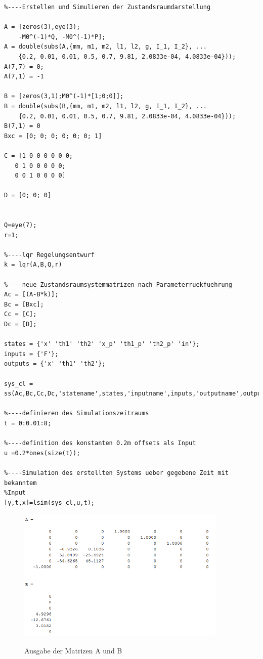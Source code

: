 \documentclass[a4paper, 10pt]{report}
\begin{document}
\begin{lstlisting}
%----Erstellen und Simulieren der Zustandsraumdarstellung

A = [zeros(3),eye(3);
    -M0^(-1)*Q, -M0^(-1)*P];
A = double(subs(A,{mm, m1, m2, l1, l2, g, I_1, I_2}, ...
    {0.2, 0.01, 0.01, 0.5, 0.7, 9.81, 2.0833e-04, 4.0833e-04}));
A(7,7) = 0;
A(7,1) = -1

B = [zeros(3,1);M0^(-1)*[1;0;0]];
B = double(subs(B,{mm, m1, m2, l1, l2, g, I_1, I_2}, ...
    {0.2, 0.01, 0.01, 0.5, 0.7, 9.81, 2.0833e-04, 4.0833e-04}));
B(7,1) = 0
Bxc = [0; 0; 0; 0; 0; 0; 1]

C = [1 0 0 0 0 0 0;
   0 1 0 0 0 0 0;
   0 0 1 0 0 0 0]

D = [0; 0; 0]


Q=eye(7);
r=1;

%----lqr Regelungsentwurf
k = lqr(A,B,Q,r)

%----neue Zustandsraumsystemmatrizen nach Parameterruekfuehrung
Ac = [(A-B*k)];
Bc = [Bxc];
Cc = [C];
Dc = [D];

states = {'x' 'th1' 'th2' 'x_p' 'th1_p' 'th2_p' 'in'};
inputs = {'F'};
outputs = {'x' 'th1' 'th2'};

sys_cl = ss(Ac,Bc,Cc,Dc,'statename',states,'inputname',inputs,'outputname',outputs);

%----definieren des Simulationszeitraums
t = 0:0.01:8;

%----definition des konstanten 0.2m offsets als Input
u =0.2*ones(size(t));

%----Simulation des erstellten Systems ueber gegebene Zeit mit bekanntem
%Input
[y,t,x]=lsim(sys_cl,u,t);
\end{lstlisting}
\begin{figure}[h]
\centering  %
{\includegraphics[width=10cm]{MatrixAB}}
\caption{Ausgabe der Matrizen A und B}
\end{figure}
\end{document}
